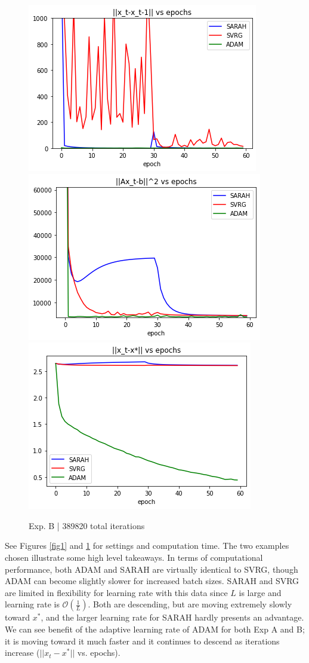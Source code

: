 \documentclass[letterpaper,11 pt]{article}
\begin{document}
\begin{figure}[htb]
\begin{centering}
\centering
\includegraphics[width=0.32\linewidth]{images/B1}
\includegraphics[width=0.32\linewidth]{images/B2} 
\includegraphics[width=0.32\linewidth]{images/B3}
\end{centering}
\begin{centering}
\centering
\end{centering}
\caption{Exp. B | 389820 total iterations}
\label{fig2}
\end{figure}

See Figures \ref{fig1} and \ref{fig2} for settings and computation time. The two examples chosen illustrate some high level takeaways. In terms of computational performance, both ADAM and SARAH are virtually identical to SVRG, though ADAM can become slightly slower for increased batch sizes. SARAH and SVRG are limited in flexibility for learning rate with this data since $L$ is large and learning rate is $\mathcal{O}(\frac{1}{L})$. Both are descending, but are moving extremely slowly toward $x^*$, and the larger learning rate for SARAH hardly presents an advantage. We can see benefit of the adaptive learning rate of ADAM for both Exp A and B; it is moving toward it much faster and it continues to descend as iterations increase ($||x_t-x^*||$ vs. epochs).
\end{document}
